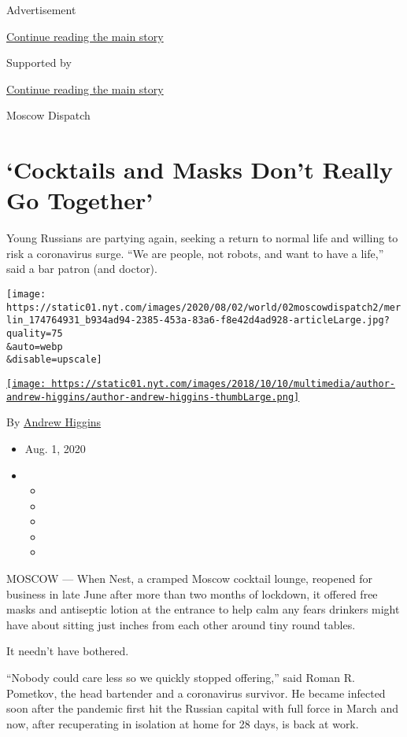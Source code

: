 Advertisement

\protect\hyperlink{after-top}{Continue reading the main story}

Supported by

\protect\hyperlink{after-sponsor}{Continue reading the main story}

Moscow Dispatch

\hypertarget{cocktails-and-masks-dont-really-go-together}{%
\section{`Cocktails and Masks Don't Really Go
Together'}\label{cocktails-and-masks-dont-really-go-together}}

Young Russians are partying again, seeking a return to normal life and
willing to risk a coronavirus surge. ``We are people, not robots, and
want to have a life,'' said a bar patron (and doctor).

\texttt{[image: https://static01.nyt.com/images/2020/08/02/world/02moscowdispatch2/merlin\_174764931\_b934ad94-2385-453a-83a6-f8e42d4ad928-articleLarge.jpg?quality=75\\\&auto=webp\\\&disable=upscale]}

\href{https://www.nytimes.com/by/andrew-higgins}{\texttt{[image: https://static01.nyt.com/images/2018/10/10/multimedia/author-andrew-higgins/author-andrew-higgins-thumbLarge.png]}}

By \href{https://www.nytimes.com/by/andrew-higgins}{Andrew Higgins}

\begin{itemize}
\item
  Aug. 1, 2020
\item
  \begin{itemize}
  \item
  \item
  \item
  \item
  \item
  \end{itemize}
\end{itemize}

MOSCOW --- When Nest, a cramped Moscow cocktail lounge, reopened for
business in late June after more than two months of lockdown, it offered
free masks and antiseptic lotion at the entrance to help calm any fears
drinkers might have about sitting just inches from each other around
tiny round tables.

It needn't have bothered.

``Nobody could care less so we quickly stopped offering,'' said Roman R.
Pometkov, the head bartender and a coronavirus survivor. He became
infected soon after the pandemic first hit the Russian capital with full
force in March and now, after recuperating in isolation at home for 28
days, is back at work.

